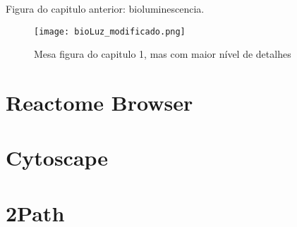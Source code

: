 Figura do capitulo anterior: bioluminescencia.

\begin{figure}[h]
\centering
\texttt{[image: bioLuz\_modificado.png]}
\caption{Mesa figura do capitulo 1, mas com maior nível de detalhes}
\label{terpenoidBackboneKEGG}
\end{figure}

\section{Reactome Browser}

\section{Cytoscape}

\section{2Path}

